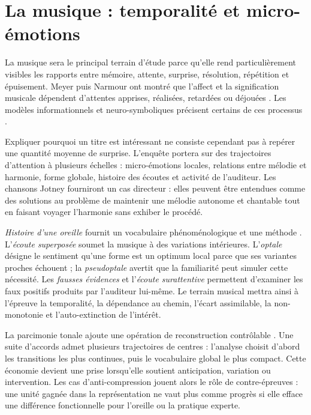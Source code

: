 \documentclass[11pt,a4paper]{article}
\begin{document}
\section{La musique : temporalité et micro-émotions}

La musique sera le principal terrain d'étude parce qu'elle rend
particulièrement visibles les rapports entre mémoire, attente, surprise,
résolution, répétition et épuisement. Meyer puis Narmour ont montré que l'affect
et la signification musicale dépendent d'attentes apprises, réalisées, retardées
ou déjouées
\parencite{meyer1956emotion,narmour1990basic,narmour1992complexity}. Les modèles
informationnels et neuro-symboliques précisent certains de ces processus
\parencite{abdallah2009information,berger1999expectations,gang1999unified}.

Expliquer pourquoi un titre est intéressant ne consiste cependant pas à repérer
une quantité moyenne de surprise. L'enquête portera sur des trajectoires
d'attention à plusieurs échelles : micro-émotions locales, relations entre
mélodie et harmonie, forme globale, histoire des écoutes et activité de
l'auditeur. Les chansons Jotney fourniront un cas directeur : elles peuvent être
entendues comme des solutions au problème de maintenir une mélodie autonome et
chantable tout en faisant voyager l'harmonie sans exhiber le procédé.

\emph{Histoire d'une oreille} fournit un vocabulaire phénoménologique et une
méthode \parencite{pachet2018oreille}. L'\emph{écoute superposée} soumet la
musique à des variations intérieures. L'\emph{optale} désigne le sentiment
qu'une forme est un optimum local parce que ses variantes proches échouent ; la
\emph{pseudoptale} avertit que la familiarité peut simuler cette nécessité. Les
\emph{fausses évidences} et l'\emph{écoute surattentive} permettent d'examiner
les faux positifs produits par l'auditeur lui-même. Le terrain musical mettra
ainsi à l'épreuve la temporalité, la dépendance au chemin, l'écart assimilable,
la non-monotonie et l'auto-extinction de l'intérêt.

La parcimonie tonale ajoute une opération de reconstruction contrôlable
\parencite{pachet2026tonalparsimony}. Une suite d'accords admet plusieurs
trajectoires de centres : l'analyse choisit d'abord les transitions les plus
continues, puis le vocabulaire global le plus compact. Cette économie devient
une prise lorsqu'elle soutient anticipation, variation ou intervention. Les cas
d'anti-compression jouent alors le rôle de contre-épreuves : une unité gagnée
dans la représentation ne vaut plus comme progrès si elle efface une différence
fonctionnelle pour l'oreille ou la pratique experte.
\end{document}

